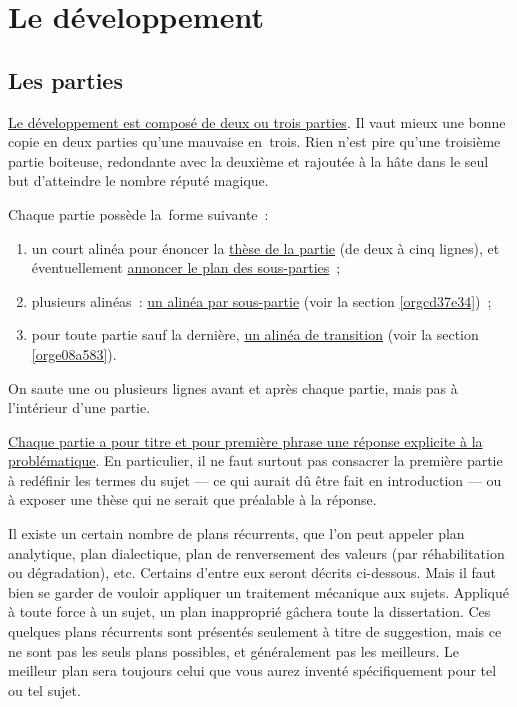 \documentclass[a4paper,12pt]{report}
\begin{document}
\chapter{Le développement}
\label{sec:org83e1ede}
\label{org3c71820}

\section{Les parties}
\label{sec:org677ab3f}
\label{org1593a54}

\uline{Le développement est composé de deux ou trois parties}. Il vaut mieux
une bonne copie en deux parties qu'une mauvaise en trois. Rien n'est
pire qu'une troisième partie boiteuse, redondante avec la deuxième et
rajoutée à la hâte dans le seul but d'atteindre le nombre réputé
magique.

Chaque partie possède la forme suivante :

\begin{enumerate}
\item un court alinéa pour énoncer la \uline{thèse de la partie} (de deux à cinq
lignes), et éventuellement \uline{annoncer le plan des sous-parties} ;
\item plusieurs alinéas : \uline{un alinéa par sous-partie} (voir la section
\ref{orgcd37e34}) ;
\item pour toute partie sauf la dernière, \uline{un alinéa de transition} (voir
la section \ref{orge08a583}).
\end{enumerate}

On saute une ou plusieurs lignes avant et après chaque partie, mais pas
à l'intérieur d'une partie.

\uline{Chaque partie a pour titre et pour première phrase une réponse
explicite à la problématique}. En particulier, il ne faut surtout pas
consacrer la première partie à redéfinir les termes du sujet --- ce qui
aurait dû être fait en introduction --- ou à exposer une thèse qui ne
serait que préalable à la réponse.

Il existe un certain nombre de plans récurrents, que l'on peut appeler
plan analytique, plan dialectique, plan de renversement des valeurs (par
réhabilitation ou dégradation), etc. Certains d'entre eux seront décrits
ci-dessous. Mais il faut bien se garder de vouloir appliquer un
traitement mécanique aux sujets. Appliqué à toute force à un sujet, un
plan inapproprié gâchera toute la dissertation. Ces quelques plans
récurrents sont présentés seulement à titre de suggestion, mais ce ne
sont pas les seuls plans possibles, et généralement pas les meilleurs.
Le meilleur plan sera toujours celui que vous aurez inventé
spécifiquement pour tel ou tel sujet.
\end{document}
